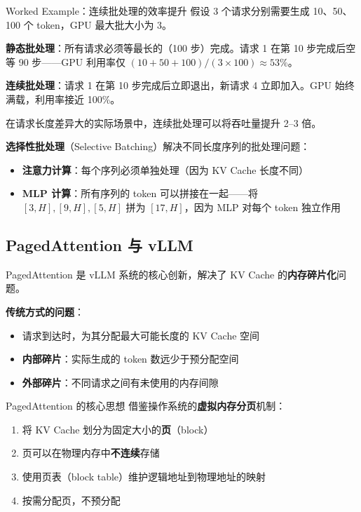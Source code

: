 \documentclass[a4paper]{article}
\begin{document}
\begin{knowledgebox}{Worked Example：连续批处理的效率提升}
假设 3 个请求分别需要生成 10、50、100 个 token，GPU 最大批大小为 3。

\textbf{静态批处理}：所有请求必须等最长的（100 步）完成。请求 1 在第 10 步完成后空等 90 步——GPU 利用率仅 $(10+50+100)/(3 \times 100) \approx 53\%$。

\textbf{连续批处理}：请求 1 在第 10 步完成后立即退出，新请求 4 立即加入。GPU 始终满载，利用率接近 100\%。

在请求长度差异大的实际场景中，连续批处理可以将吞吐量提升 2--3 倍。
\end{knowledgebox}

\textbf{选择性批处理}（Selective Batching）解决不同长度序列的批处理问题：

\begin{itemize}
    \item \textbf{注意力计算}：每个序列必须单独处理（因为 KV Cache 长度不同）
    \item \textbf{MLP 计算}：所有序列的 token 可以拼接在一起——将 $[3, H], [9, H], [5, H]$ 拼为 $[17, H]$，因为 MLP 对每个 token 独立作用
\end{itemize}

\subsection{PagedAttention 与 vLLM}

PagedAttention 是 vLLM 系统的核心创新，解决了 KV Cache 的\textbf{内存碎片化}问题。

\textbf{传统方式的问题}：

\begin{itemize}
    \item 请求到达时，为其分配最大可能长度的 KV Cache 空间
    \item \textbf{内部碎片}：实际生成的 token 数远少于预分配空间
    \item \textbf{外部碎片}：不同请求之间有未使用的内存间隙
\end{itemize}

\begin{importantbox}{PagedAttention 的核心思想}
借鉴操作系统的\textbf{虚拟内存分页}机制：
\begin{enumerate}
    \item 将 KV Cache 划分为固定大小的\textbf{页}（block）
    \item 页可以在物理内存中\textbf{不连续}存储
    \item 使用页表（block table）维护逻辑地址到物理地址的映射
    \item 按需分配页，不预分配
\end{enumerate}
\end{importantbox}
\end{document}
